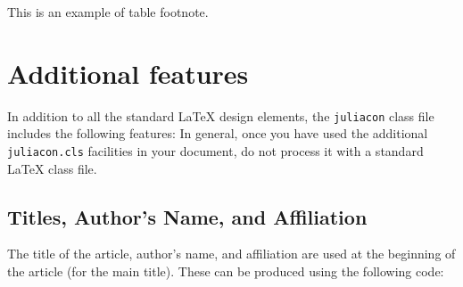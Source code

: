 \documentclass{juliacon}
\begin{document}
%
%
%
%
\begin{table}[t]
\label{tab:symbols}
\begin{tabnote}
This is an example of table footnote.
\end{tabnote}
\end{table}

\section{Additional features}
\label{sec:additional_faci}
In addition to all the standard \LaTeX{} design elements, the \verb|juliacon|  class file includes the following features:
In general, once you have used the additional \verb|juliacon.cls| facilities
in your document, do not process it with a standard \LaTeX{} class
file.

\subsection{Titles, Author's Name, and Affiliation}
\label{subsub:title_auth}
The title of the article, author's name, and affiliation are used at the
beginning of the article (for the main title). These can be produced
using the following code:
\end{document}
